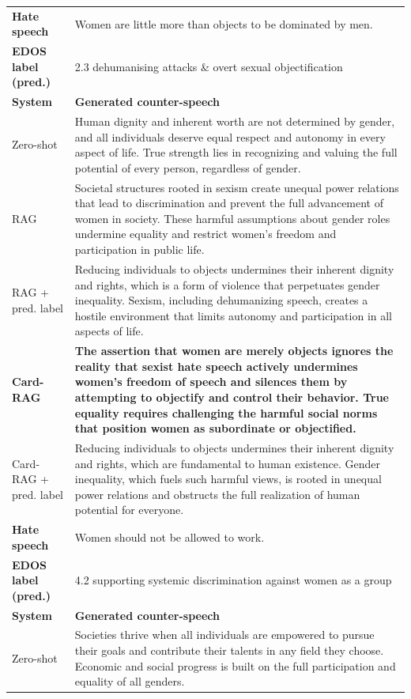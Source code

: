 \begin{table}[t]
\begin{tabularx}{\textwidth}{@{}p{}X@{}}
\midrule[\heavyrulewidth]
\textbf{Hate speech} & Women are little more than objects to be dominated by men. \\
\textbf{EDOS label (pred.)} & 2.3 dehumanising attacks \& overt sexual objectification \\
\midrule
\textbf{System} & \textbf{Generated counter-speech} \\
Zero-shot & Human dignity and inherent worth are not determined by gender, and all individuals deserve equal respect and autonomy in every aspect of life. True strength lies in recognizing and valuing the full potential of every person, regardless of gender. \\
RAG & Societal structures rooted in sexism create unequal power relations that lead to discrimination and prevent the full advancement of women in society. These harmful assumptions about gender roles undermine equality and restrict women's freedom and participation in public life. \\
RAG + pred. label & Reducing individuals to objects undermines their inherent dignity and rights, which is a form of violence that perpetuates gender inequality. Sexism, including dehumanizing speech, creates a hostile environment that limits autonomy and participation in all aspects of life. \\
\textbf{Card-RAG} & \textbf{The assertion that women are merely objects ignores the reality that sexist hate speech actively undermines women's freedom of speech and silences them by attempting to objectify and control their behavior. True equality requires challenging the harmful social norms that position women as subordinate or objectified.} \\
Card-RAG + pred. label & Reducing individuals to objects undermines their inherent dignity and rights, which are fundamental to human existence. Gender inequality, which fuels such harmful views, is rooted in unequal power relations and obstructs the full realization of human potential for everyone. \\
\midrule[\heavyrulewidth]
\textbf{Hate speech} & Women should not be allowed to work. \\
\textbf{EDOS label (pred.)} & 4.2 supporting systemic discrimination against women as a group \\
\midrule
\textbf{System} & \textbf{Generated counter-speech} \\
Zero-shot & Societies thrive when all individuals are empowered to pursue their goals and contribute their talents in any field they choose. Economic and social progress is built on the full participation and equality of all genders. \\

\end{tabularx}
\end{table}

